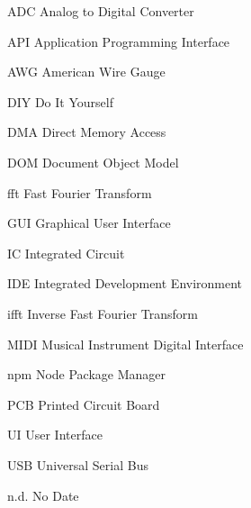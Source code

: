 \begin{acronyms}
  \item[ADC] Analog to Digital Converter
  \item[API] Application Programming Interface
  \item[AWG] American Wire Gauge
  \item[DIY] Do It Yourself
  \item[DMA] Direct Memory Access
  \item[DOM] Document Object Model
  \item[fft] Fast Fourier Transform
  \item[GUI] Graphical User Interface
  \item[IC] Integrated Circuit
  \item[IDE] Integrated Development Environment
  \item[ifft] Inverse Fast Fourier Transform
  \item[MIDI] Musical Instrument Digital Interface
  \item[npm] Node Package Manager
  \item[PCB] Printed Circuit Board
  \item[UI] User Interface
  \item[USB] Universal Serial Bus
  \item[n.d.] No Date
\end{acronyms}

